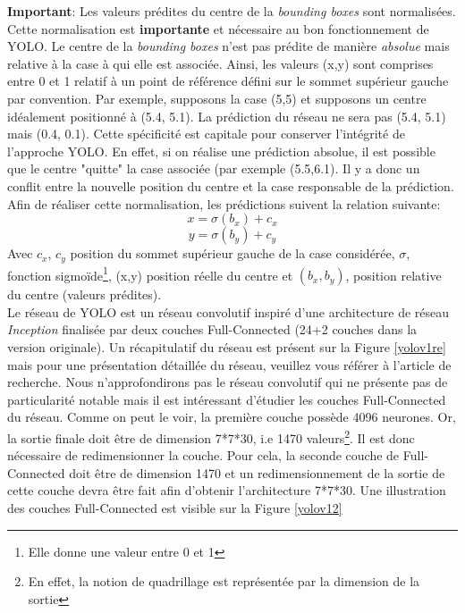 \noindent \textbf{Important}: Les valeurs prédites du centre de la \textit{bounding boxes} sont normalisées. Cette normalisation est \textbf{importante} et nécessaire au bon fonctionnement de YOLO. Le centre de la \textit{bounding boxes} n'est pas prédite de manière \textit{absolue} mais relative à la case à qui elle est associée. Ainsi, les valeurs (x,y) sont comprises entre 0 et 1 relatif à un point de référence défini sur le sommet supérieur gauche par convention. Par exemple, supposons la case (5,5) et supposons un centre idéalement positionné à (5.4, 5.1). La prédiction du réseau ne sera pas (5.4, 5.1) mais (0.4, 0.1). Cette spécificité est capitale pour conserver l'intégrité de l'approche YOLO. En effet, si on réalise une prédiction absolue, il est possible que le centre "quitte" la case associée (par exemple (5.5,6.1). Il y a donc un conflit entre la nouvelle position du centre et la case responsable de la prédiction. Afin de réaliser cette normalisation, les prédictions suivent la relation suivante:
$$ x = \sigma(b_x) + c_x $$
$$ y = \sigma(b_y) + c_y $$
Avec $c_x$, $c_y$ position du sommet supérieur gauche de la case considérée, $\sigma$, fonction sigmoïde\footnote{Elle donne une valeur entre 0 et 1}, (x,y) position réelle du centre et $(b_x,b_y)$, position relative du centre (valeurs prédites).\\

\noindent Le réseau de YOLO est un réseau convolutif inspiré d'une architecture de réseau \textit{Inception} finalisée par deux couches Full-Connected (24+2 couches dans la version originale). Un récapitulatif du réseau est présent sur la Figure \ref{yolov1re} mais pour une présentation détaillée du réseau, veuillez vous référer à l'article de recherche\cite{yolo_deep}. Nous n'approfondirons pas le réseau convolutif qui ne présente pas de particularité notable mais il est intéressant d'étudier les couches Full-Connected du réseau. Comme on peut le voir, la première couche possède 4096 neurones. Or, la sortie finale doit être de dimension 7*7*30, i.e 1470 valeurs\footnote{En effet, la notion de quadrillage est représentée par la dimension de la sortie}.  Il est donc nécessaire de redimensionner la couche. Pour cela, la seconde couche de Full-Connected doit être de dimension 1470 et un redimensionnement de la sortie de cette couche devra être fait afin d'obtenir l'architecture 7*7*30. Une illustration des couches Full-Connected est visible sur la Figure \ref{yolov12}\\

